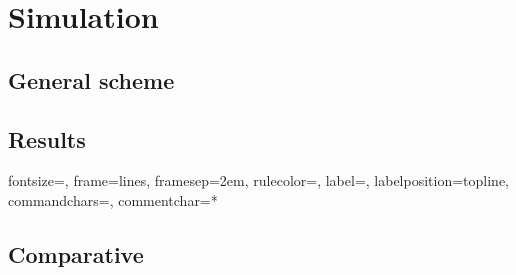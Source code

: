 \section{Simulation}
\subsection{General scheme}
\frame{}
\frame{}
\frame{}
\frame{}

\subsection{Results}
\frame{}

{}%
{fontsize=\footnotesize,
 frame=lines,  %
 framesep=2em, %
 rulecolor=\color{Gray},
 label=,
 labelposition=topline,
 commandchars=\|\(\), %
 commentchar=*        %
}

\begin{frame}
\end{frame}

\subsection{Comparative}
\frame{}
